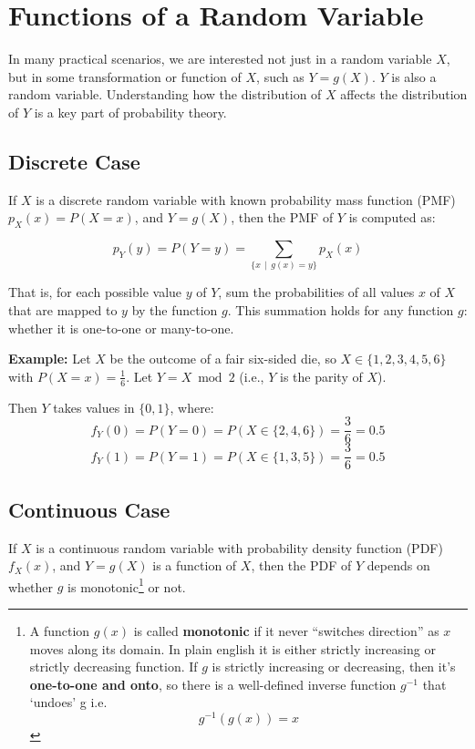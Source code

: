 \documentclass[twoside]{book}
\begin{document}


\section{Functions of a Random Variable}

In many practical scenarios, we are interested not just in a random variable $X$, but in some transformation or {function} of $X$, such as $Y = g(X)$. $Y$ is also a random variable. Understanding how the distribution of $X$ affects the distribution of $Y$ is a key part of probability theory.

\subsection{Discrete Case}

If $X$ is a discrete random variable with known probability mass function (PMF) $p_X(x) = P(X=x)$, and $Y = g(X)$, then the PMF of $Y$ is computed as:

\begin{textbox}
\[
p_Y(y) = P(Y = y) = \sum_{\{x \,\mid \, g(x) = y\}} p_X(x)
\]
\end{textbox}

That is, for each possible value $y$ of $Y$, sum the probabilities of all values $x$ of $X$ that are mapped to $y$ by the function $g$. This summation holds for any function $g$: whether it is one-to-one or many-to-one.

\vspace{2mm}

\textbf{Example:} Let $X$ be the outcome of a fair six-sided die, so $X \in \{1, 2, 3, 4, 5, 6\}$ with $P(X = x) = \frac{1}{6}$. Let $Y = X \bmod 2$ (i.e., $Y$ is the parity of $X$).

Then $Y$ takes values in $\{0, 1\}$, where:
\[
f_Y(0) = P(Y = 0) = P(X \in \{2, 4, 6\}) = \frac{3}{6} = 0.5
\]
\[
f_Y(1) = P(Y = 1) = P(X \in \{1, 3, 5\}) = \frac{3}{6} = 0.5
\]

\subsection{Continuous Case}

If $X$ is a continuous random variable with probability density function (PDF) $f_X(x)$, and $Y = g(X)$ is a function of $X$, then the PDF of $Y$ depends on whether $g$ is monotonic\footnote{A function $g(x)$ is called \textbf{monotonic} if it never ``switches direction'' as $x$ moves along its domain. In plain english it is either strictly increasing or strictly decreasing function. If $g$ is strictly increasing or decreasing, then it’s \textbf{one-to-one and onto}, so there is a well-defined inverse function $g^{-1}$  that `undoes' g i.e.
  $$g^{-1}(g(x)) = x$$} or not.
\end{document}
